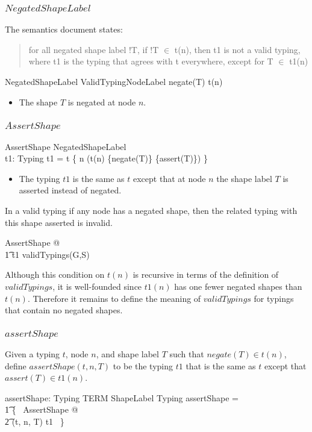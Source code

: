 \documentclass{article}
\begin{document}
\subsubsection{$NegatedShapeLabel$}
The semantics document states:
\begin{quote}
for all negated shape label !T, if !T $\in$ t(n), then t1 is not a valid typing, where t1 is the typing that agrees with t everywhere, except for T $\in$ t1(n)
\end{quote}
\begin{schema}{NegatedShapeLabel}
	ValidTypingNodeLabel
\where
	negate(T) \in t(n)
\end{schema}
\begin{itemize}
\item The shape $T$ is negated at node $n$.
\end{itemize}

\subsubsection{$AssertShape$}
\begin{schema}{AssertShape}
	NegatedShapeLabel \\
	t1: Typing
\where
	t1 = t \oplus \{ n \mapsto (t(n) \setminus \{negate(T)\} \cup \{assert(T)\}) \}
\end{schema}
\begin{itemize}
\item The typing $t1$ is the same as $t$ except that at node $n$ the shape label $T$ is asserted instead of negated.
\end{itemize}

In a valid typing if any node has a negated shape, then the related typing with this shape asserted is invalid.
\begin{zed}
	\forall AssertShape @ \\
\t1		t1 \notin validTypings(G,S)
\end{zed}
Although this condition on $t(n)$ is recursive in terms of the definition of $validTypings$, 
it is well-founded since $t1(n)$ has one fewer negated shapes than $t(n)$. 
Therefore it remains to define the meaning of $validTypings$ for typings that contain no negated shapes.

\subsubsection{$assertShape$}
Given a typing $t$, node $n$, and shape label $T$ such that $negate(T) \in t(n)$, define $assertShape(t,n,T)$ to be the typing $t1$
that is the same as $t$ except that $assert(T) \in t1(n)$.
\begin{axdef}
	assertShape: Typing \cross TERM \cross ShapeLabel \pfun Typing
\where
	assertShape = \\
\t1		\{~ AssertShape @ \\
\t2			(t, n, T) \mapsto t1 ~\}
\end{axdef}
\end{document}
